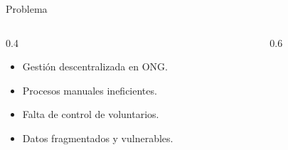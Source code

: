 \documentclass[aspectratio=169]{beamer}
\begin{document}
\begin{frame}{Problema}
    \begin{columns}[T]
        \begin{column}{0.4\textwidth}
            \vspace{1cm}
            \begin{itemize}
                \item Gestión descentralizada en ONG.
                \item Procesos manuales ineficientes.
                \item Falta de control de voluntarios.
                \item Datos fragmentados y vulnerables.
            \end{itemize}
        \end{column}
        \begin{column}{0.6\textwidth}
            \centering
        \end{column}
    \end{columns}
\end{frame}
\end{document}

